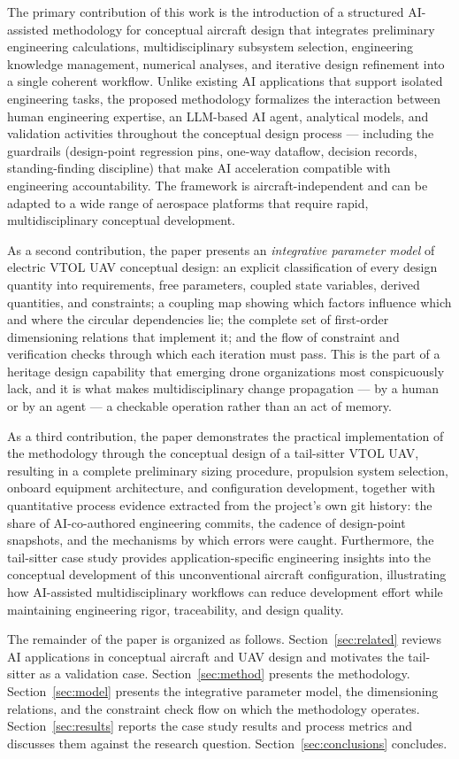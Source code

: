 The primary contribution of this work is the introduction of a
structured AI-assisted methodology for conceptual aircraft design that
integrates preliminary engineering calculations, multidisciplinary
subsystem selection, engineering knowledge management, numerical
analyses, and iterative design refinement into a single coherent
workflow. Unlike existing AI applications that support isolated
engineering tasks, the proposed methodology formalizes the interaction
between human engineering expertise, an LLM-based AI agent, analytical
models, and validation activities throughout the conceptual design
process --- including the guardrails (design-point regression pins,
one-way dataflow, decision records, standing-finding discipline) that
make AI acceleration compatible with engineering accountability. The
framework is aircraft-independent and can be adapted to a wide range of
aerospace platforms that require rapid, multidisciplinary conceptual
development.

As a second contribution, the paper presents an \emph{integrative
parameter model} of electric VTOL UAV conceptual design: an explicit
classification of every design quantity into requirements, free
parameters, coupled state variables, derived quantities, and
constraints; a coupling map showing which factors influence which and
where the circular dependencies lie; the complete set of first-order
dimensioning relations that implement it; and the flow of constraint
and verification checks through which each iteration must pass. This is
the part of a heritage design capability that emerging drone
organizations most conspicuously lack, and it is what makes
multidisciplinary change propagation --- by a human or by an agent ---
a checkable operation rather than an act of memory.

As a third contribution, the paper demonstrates the practical
implementation of the methodology through the conceptual design of a
tail-sitter VTOL UAV, resulting in a complete preliminary sizing
procedure, propulsion system selection, onboard equipment architecture,
and configuration development, together with quantitative process
evidence extracted from the project's own git history: the share of
AI-co-authored engineering commits, the cadence of design-point
snapshots, and the mechanisms by which errors were caught. Furthermore,
the tail-sitter case study provides application-specific engineering
insights into the conceptual development of this unconventional
aircraft configuration, illustrating how AI-assisted multidisciplinary
workflows can reduce development effort while maintaining engineering
rigor, traceability, and design quality.

The remainder of the paper is organized as follows.
Section~\ref{sec:related} reviews AI applications in conceptual
aircraft and UAV design and motivates the tail-sitter as a validation
case. Section~\ref{sec:method} presents the methodology.
Section~\ref{sec:model} presents the integrative parameter model, the
dimensioning relations, and the constraint check flow on which the
methodology operates. Section~\ref{sec:results} reports the case study
results and process metrics and discusses them against the research
question. Section~\ref{sec:conclusions} concludes.
